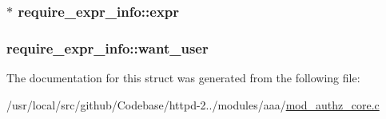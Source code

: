 \subsubsection[{\texorpdfstring{expr}{expr}}]{$\ast$ require\+\_\+expr\+\_\+info\+::expr}\hypertarget{structrequire__expr__info_a7ecf28fea663047a43315344fdf0df80}{}\label{structrequire__expr__info_a7ecf28fea663047a43315344fdf0df80}
\subsubsection[{\texorpdfstring{want\+\_\+user}{want_user}}]{ require\+\_\+expr\+\_\+info\+::want\+\_\+user}\hypertarget{structrequire__expr__info_a5f5166ca9d65d558c9ae9adaf84a7697}{}\label{structrequire__expr__info_a5f5166ca9d65d558c9ae9adaf84a7697}


The documentation for this struct was generated from the following file\+:\begin{DoxyCompactItemize}
\item 
/usr/local/src/github/\+Codebase/httpd-\/2../modules/aaa/\hyperlink{mod__authz__core_8c}{mod\+\_\+authz\+\_\+core.\+c}\end{DoxyCompactItemize}
